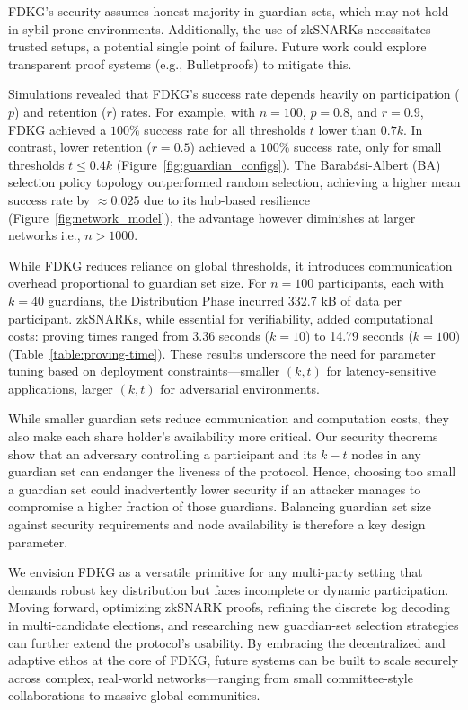 \documentclass[lettersize,journal]{IEEEtran}
\theoremstyle{definition}
\begin{document}
FDKG’s security assumes honest majority in guardian sets, which may not hold in sybil-prone environments. Additionally, the use of zkSNARKs necessitates trusted setups, a potential single point of failure. Future work could explore transparent proof systems (e.g., Bulletproofs) to mitigate this.

Simulations revealed that FDKG’s success rate depends heavily on participation (\(p\)) and retention (\(r\)) rates. For example, with \(n = 100\), \(p = 0.8\), and \(r = 0.9\), FDKG achieved a $100\%$ success rate for all thresholds $t$ lower than $0.7 k$. In contrast, lower retention (\(r = 0.5\)) achieved a $100\%$ success rate, only for small thresholds $t \leq 0.4 k$ (Figure~\ref{fig:guardian_configs}). The Barabási-Albert (BA) selection policy topology outperformed random selection, achieving a higher mean success rate by $\approx 0.025$ due to its hub-based resilience (Figure~\ref{fig:network_model}), the advantage however diminishes at larger networks i.e., $n>1000$.

While FDKG reduces reliance on global thresholds, it introduces communication overhead proportional to guardian set size. For \(n = 100\) participants, each with \(k = 40\) guardians, the Distribution Phase incurred 332.7 kB of data per participant. zkSNARKs, while essential for verifiability, added computational costs: proving times ranged from 3.36 seconds (\(k = 10\)) to 14.79 seconds (\(k = 100\)) (Table~\ref{table:proving-time}). These results underscore the need for parameter tuning based on deployment constraints—smaller \((k,t)\) for latency-sensitive applications, larger \((k,t)\) for adversarial environments.  


While smaller guardian sets reduce communication and computation costs, they also make each share holder’s availability more critical. Our security theorems show that an adversary controlling a participant and its $k - t$ nodes in any guardian set can endanger the liveness of the protocol. Hence, choosing too small a guardian set could inadvertently lower security if an attacker manages to compromise a higher fraction of those guardians. Balancing guardian set size against security requirements and node availability is therefore a key design parameter.

We envision FDKG as a versatile primitive for any multi-party setting that demands robust key distribution but faces incomplete or dynamic participation. Moving forward, optimizing zkSNARK proofs, refining the discrete log decoding in multi-candidate elections, and researching new guardian-set selection strategies can further extend the protocol’s usability. By embracing the decentralized and adaptive ethos at the core of FDKG, future systems can be built to scale securely across complex, real-world networks—ranging from small committee-style collaborations to massive global communities.
\end{document}
